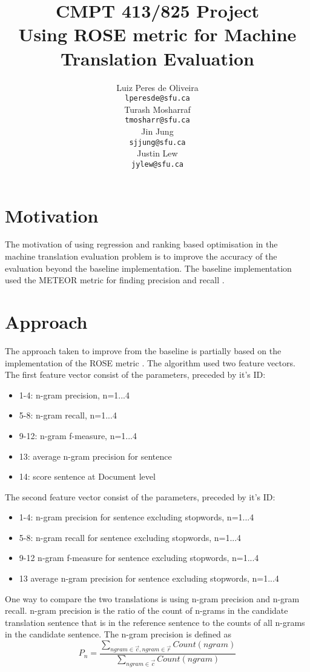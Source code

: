 \documentclass[11pt,letterpaper]{article}
\title{CMPT 413/825 Project\\Using ROSE metric for Machine Translation Evaluation}
\author{Luiz Peres de Oliveira \\
  {\tt lperesde@sfu.ca} \\\And
  Turash Mosharraf \\
  {\tt tmosharr@sfu.ca} \\\And
  Jin Jung \\
  {\tt sjjung@sfu.ca} \\\And
  Justin Lew \\
  {\tt jylew@sfu.ca}
  }
\date{}
\begin{document}
\maketitle

\section{Motivation}

The motivation of using regression and ranking based optimisation in the machine translation evaluation problem is to improve the accuracy of the evaluation beyond the baseline implementation. The baseline implementation used the METEOR metric for finding precision and recall \cite{lavie2007meteor}.

\section{Approach}

The approach taken to improve from the baseline is partially based on the implementation of the ROSE metric \cite{song2011regression}. The algorithm used two feature vectors. The first feature vector consist of the parameters, preceded by it's ID:
	\begin{itemize}
		\item 1-4: n-gram precision, n=1...4
		\item 5-8: n-gram recall, n=1...4
		\item 9-12: n-gram f-measure, n=1...4
		\item 13: average n-gram precision for sentence
		\item 14: score sentence at Document level
	\end{itemize}
The second feature vector consist of the parameters, preceded by it's ID:
	\begin{itemize}
		\item 1-4: n-gram precision for sentence excluding stopwords, n=1...4
		\item 5-8: n-gram recall for sentence excluding stopwords, n=1...4
		\item 9-12 n-gram f-measure for sentence excluding stopwords, n=1...4
		\item 13 average n-gram precision for sentence excluding stopwords, n=1...4
	\end{itemize}

One way to compare the two translations is using n-gram precision and n-gram recall. n-gram precision is the ratio of the count of n-grams in the candidate translation sentence that is in the reference sentence to the counts of all n-grams in the candidate sentence. The n-gram precision is defined as 
	\[P_{n} = \frac{\sum_{ngram \in \vec{c}, ngram \in \vec{r}} Count(ngram)}{\sum_{ngram\in \vec{c}} Count(ngram)  } \]
\end{document}
